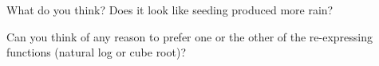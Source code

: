 \documentclass[12pt,letterpaper]{hmcpset}
\begin{document}
\begin{solution}

\end{solution}

\begin{problem}[f]

    What do you think? Does it look like seeding produced more rain?

\end{problem}

\begin{solution}

\end{solution}

\begin{problem}[g]

     Can you think of any reason to prefer one or the other of the re-expressing functions (natural log or cube root)?

\end{problem}

\begin{solution}

\end{solution}
\end{document}
